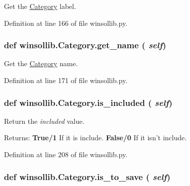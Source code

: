 Get the \hyperlink{classwinsollib_1_1Category}{Category} label. 



Definition at line 166 of file winsollib.py.\hypertarget{classwinsollib_1_1Category_0bb87a7a5079943ef8ed7e207ba87552}{
\subsubsection[get\_\-name]{\setlength{\rightskip}{0pt plus 5cm}def winsollib.Category.get\_\-name ( {\em self})}}
\label{classwinsollib_1_1Category_0bb87a7a5079943ef8ed7e207ba87552}


Get the \hyperlink{classwinsollib_1_1Category}{Category} name. 



Definition at line 171 of file winsollib.py.\hypertarget{classwinsollib_1_1Category_c3de054ef3bfb2c97abe4b6ddebc3e63}{
\subsubsection[is\_\-included]{\setlength{\rightskip}{0pt plus 5cm}def winsollib.Category.is\_\-included ( {\em self})}}
\label{classwinsollib_1_1Category_c3de054ef3bfb2c97abe4b6ddebc3e63}


Return the {\em included\/} value. 

\begin{Desc}
\item[Returns:]{\bf True/1} If it is include. {\bf False/0} If it isn't include. \end{Desc}


Definition at line 208 of file winsollib.py.\hypertarget{classwinsollib_1_1Category_a144aa5fc30058626bc9da60117098d1}{
\subsubsection[is\_\-to\_\-save]{\setlength{\rightskip}{0pt plus 5cm}def winsollib.Category.is\_\-to\_\-save ( {\em self})}}
\label{classwinsollib_1_1Category_a144aa5fc30058626bc9da60117098d1}


